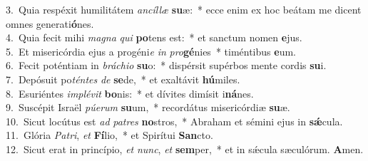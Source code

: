 {3.~}Quia respéxit humilitátem \textit{an}\textit{cíl}\textit{læ} \textbf{su}æ:~* ecce enim ex hoc beátam me dicent omnes generati\textbf{ó}nes.\\
{4.~}Quia fecit mihi \textit{ma}\textit{gna} \textit{qui} \textbf{po}tens est:~* et sanctum nomen \textbf{e}jus.\\
{5.~}Et misericórdia ejus a progéni\textit{e} \textit{in} \textit{pro}\textbf{gé}nies~* timéntibus \textbf{e}um.\\
{6.~}Fecit poténtiam in \textit{brá}\textit{chi}\textit{o} \textbf{su}o:~* dispérsit supérbos mente cordis \textbf{su}i.\\
{7.~}Depósuit po\textit{tén}\textit{tes} \textit{de} \textbf{se}de,~* et exaltávit \textbf{hú}miles.\\
{8.~}Esuriéntes \textit{im}\textit{plé}\textit{vit} \textbf{bo}nis:~* et dívites dimísit i\textbf{ná}nes.\\
{9.~}Suscépit Israël \textit{pú}\textit{e}\textit{rum} \textbf{su}um,~* recordátus misericórdiæ \textbf{su}æ.\\
{10.~}Sicut locútus est \textit{ad} \textit{pa}\textit{tres} \textbf{no}stros,~* Abraham et sémini ejus in \textbf{sǽ}cula.\\
{11.~}Glória \textit{Pa}\textit{tri}, \textit{et} \textbf{Fí}lio,~* et Spirítui \textbf{San}cto.\\
{12.~}Sicut erat in princípio, \textit{et} \textit{nunc}, \textit{et} \textbf{sem}per,~* et in sǽcula sæculórum. \textbf{A}men.\\

